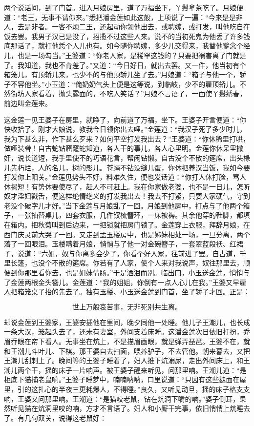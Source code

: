 两个说话间，到了门首。进入月娘房里，道了万福坐下，丫鬟拿茶吃了。月娘便道：“老王，无事不请你来。”悉把潘金莲如此这般，上项说了一遍：“今来是是非人，去是非者。一客不烦二王，还起动你领他出去，或聘嫁，或打发，叫他吃自在饭去罢。我男子汉已是没了，招揽不过这些人来。说不的当初死鬼为他丢了许多钱底那话了，就打他恁个人儿也有。如今随你聘嫁，多少儿交得来，我替他爹念个经儿，也是一场勾当。”王婆道：“你老人家，是稀罕这钱的？只要把祸害离了门就是了。我知道，我也不肯差了。”又道：“今日好日，就出去罢。又一件，他当初有个箱笼儿，有顶轿儿来，也少不的与他顶轿儿坐了去。”月娘道：“箱子与他一个，轿子不容他坐。”小玉道：“俺奶奶气头上便是这等说，到临岐，少不的雇顶轿儿。不然街坊人家看着，抛头露面的，不吃人笑话？”月娘不言语了，一面使丫鬟绣春，前边叫金莲来。

这金莲一见王婆子在房里，就睁了，向前道了万福，坐下。王婆子开言便道：“你快收拾了。刚才大娘说，教我今日领你出去哩。”金莲道：“我汉子死了多少时儿，我为下甚么非，作下甚么歹来？如何平空打发我出去？”王婆道：“你休稀里打哄，做哑装聋！自古蛇钻窟窿蛇知道，各人干的事儿，各人心里明。金莲你休呆里撒奸，说长道短，我手里使不的巧语花言，帮闲钻懒。自古没个不散的筵席，出头椽儿先朽烂，人的名儿，树的影儿。苍蝇不钻没缝儿蛋，你休把养汉当饭，我如今要打发你上阳关。”金莲见势头不好，料难久住，便也发话道：“你打人休打脸，骂人休揭短！有势休要使尽了，赶人不可赶上。我在你家做老婆，也不是一日儿，怎听奴才淫妇戳舌，便这样绝情绝义的打发我出去！我去不打紧，只要大家硬气，守到老没个破字儿才好。”当下金莲与月娘乱了一回。月娘到他房中，打点与了他两个箱子，一张抽替桌儿，四套衣服，几件钗梳簪环，一床被褥。其余他穿的鞋脚，都填在箱内。把秋菊叫到后边来，一把锁就把房门锁了。金莲穿上衣服，拜辞月娘，在西门庆灵前大哭了一回。又走到孟玉楼房中，也是姊妹相处一场，一旦分离，两个落了一回眼泪。玉楼瞒着月娘，悄悄与了他一对金碗簪子，一套翠蓝段袄、红裙子，说道：“六姐，奴与你离多会少了，你看个好人家，往前进了罢。自古道，千里长篷，也没个不散的筵席。你若有了人家，使个人来对我说声，奴往那里去，顺便到你那里看你去，也是姐妹情肠。”于是洒泪而别。临出门，小玉送金莲，悄悄与了金莲两根金头簪儿。金莲道：“我的姐姐，你倒有一点人心儿在我。”王婆又早雇人把箱笼桌子抬的先去了。独有玉楼、小玉送金莲到门首，坐了轿子才回。正是：

\[
世上万般哀苦事，无非死别共生离。
\]

却说金莲到王婆家，王婆安插他在里间，晚夕同他一处睡。他儿子王潮儿，也长成一条大汉，笼起头去了，还未有妻室，外间支着床睡。这潘金莲次日依旧打扮，乔眉乔眼在帘下看人。无事坐在炕上，不是描眉画眼，就是弹弄琵琶。王婆不在，就和王潮儿斗叶儿、下棋。那王婆自去扫面，喂养驴子，不去管他。朝来暮去，又把王潮儿刮剌上了。晚间等的王婆子睡着了，妇人推下炕溺尿，走出外间床上，和王潮儿两个干，摇的床子一片响声。被王婆子醒来听见，问那里响。王潮儿道：“是柜底下猫捕老鼠响。”王婆子睡梦中，喃喃呐呐，口里说道：“只因有这些麸面在屋里，引的这扎心的半夜三更耗爆人，不得睡。”良久，又听见动旦，摇的床子格支支响，王婆又问那里响。王潮道：“是猫咬老鼠，钻在炕洞下嚼的响。”婆子侧耳，果然听见猫在炕洞里咬的响，方才不言语了。妇人和小厮干完事，依旧悄悄上炕睡去了。有几句双关，说得这老鼠好：

